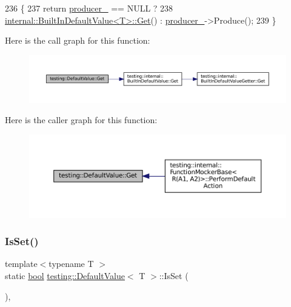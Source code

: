 \begin{DoxyCode}
236                  \{
237     \textcolor{keywordflow}{return} \hyperlink{classtesting_1_1DefaultValue_a69d60d7538ccf71d9f47164320a3bf28}{producer\_} == NULL ?
238         \hyperlink{classtesting_1_1internal_1_1BuiltInDefaultValue_a7e26c1df14a887c8f393b29d6ea162e6}{internal::BuiltInDefaultValue<T>::Get}() : 
      \hyperlink{classtesting_1_1DefaultValue_a69d60d7538ccf71d9f47164320a3bf28}{producer\_}->Produce();
239   \}
\end{DoxyCode}
Here is the call graph for this function\+:
\nopagebreak
\begin{figure}[H]
\begin{center}
\leavevmode
\includegraphics[width=350pt]{classtesting_1_1DefaultValue_a4dc6dfee4cbc9cdb36f5c9cde5cf2b83_cgraph}
\end{center}
\end{figure}
Here is the caller graph for this function\+:
\nopagebreak
\begin{figure}[H]
\begin{center}
\leavevmode
\includegraphics[width=350pt]{classtesting_1_1DefaultValue_a4dc6dfee4cbc9cdb36f5c9cde5cf2b83_icgraph}
\end{center}
\end{figure}
\mbox{\label{classtesting_1_1DefaultValue_ad49febe2c944cbbd06451ba7d0366ca1}} 
\subsubsection{\texorpdfstring{Is\+Set()}{IsSet()}}
{\footnotesize\ttfamily template$<$typename T $>$ \\
static \hyperlink{classbool}{bool} \hyperlink{classtesting_1_1DefaultValue}{testing\+::\+Default\+Value}$<$ T $>$\+::Is\+Set (\begin{DoxyParamCaption}{ }\end{DoxyParamCaption})\hspace{0.3cm}{\ttfamily [inline]}, {\ttfamily [static]}}



